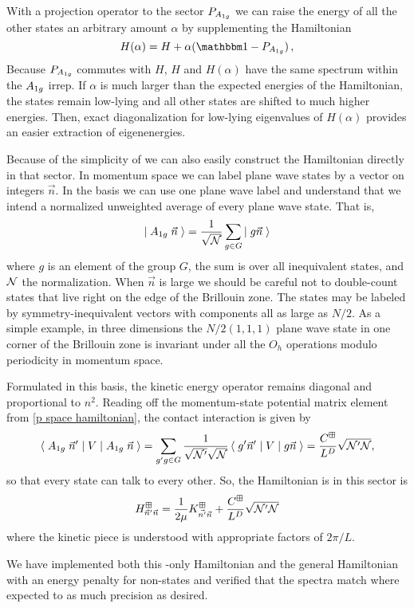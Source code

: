 With a projection operator to the \Aoneg sector $P_{A_{1g}}$ we can raise the energy of all the other states an arbitrary amount $\alpha$ by supplementing the Hamiltonian
\begin{equation}
    H(\alpha) = H + \alpha (\one - P_{\Aoneg}) \, ,
\end{equation}
Because $P_{A_{1g}}$ commutes with $H$, $H$ and $H(\alpha)$ have the same spectrum within the $A_{1g}$ irrep.
If $\alpha$ is much larger than the expected energies of the Hamiltonian, the \Aoneg states remain low-lying and all other states are shifted to much higher energies.
Then, exact diagonalization for low-lying eigenvalues of $H(\alpha)$ provides an easier extraction of \Aoneg eigenenergies.

Because of the simplicity of \Aoneg we can also easily construct the Hamiltonian directly in that sector.
In momentum space we can label plane wave states by a vector on integers $\vec{n}$.
In the \Aoneg basis we can use one plane wave label and understand that we intend a normalized unweighted average of every plane wave state.
That is,
\begin{equation}
    \left|\;A_{1g}\; \vec{n}\;\right\rangle = \frac{1}{\sqrt{\mathcal{N}}} \sum_{g \in G} \left|\; g\vec{n}\;\right\rangle
\end{equation}
where $g$ is an element of the group $G$, the sum is over all inequivalent states, and $\mathcal{N}$ the normalization.
When $\vec{n}$ is large we should be careful not to double-count states that live right on the edge of the Brillouin zone.
The states may be labeled by symmetry-inequivalent vectors with components all as large as $N/2$.
As a simple example, in three dimensions the $N/2(1,1,1)$ plane wave state in one corner of the Brillouin zone is invariant under all the $O_h$ operations modulo periodicity in momentum space.

Formulated in this basis, the kinetic energy operator remains diagonal and proportional to $n^2$.
Reading off the momentum-state potential matrix element from \eqref{p space hamiltonian}, the contact interaction is given by
\begin{equation}
    \left\langle\;A_{1g}\; \vec{n}'\;\middle|\;V\;\middle|\;A_{1g}\; \vec{n}\;\right\rangle
    =
    \sum_{g'g \in G}
        \frac{1}{\sqrt{\mathcal{N}'}\sqrt{\mathcal{N}}} \left\langle\;g'\vec{n}'\;\middle|\;V\;\middle|\;g\vec{n}\;\right\rangle
    =
    \frac{C^\boxplus}{L^D} \sqrt{\mathcal{N}'\mathcal{N}},
\end{equation}
so that every \Aoneg state can talk to every other.
So, the Hamiltonian is in this sector is
\begin{equation}
    H_{\vec{n}'\vec{n}}^\boxplus = \frac{1}{2\mu} K_{\vec{n'}\vec{n}}^\boxplus + \frac{C^\boxplus}{L^D} \sqrt{\mathcal{N}'\mathcal{N}}
\end{equation}
where the kinetic piece is understood with appropriate factors of $2\pi/L$.

We have implemented both this \Aoneg-only Hamiltonian and the general Hamiltonian with an energy penalty for non-\Aoneg states and verified that the spectra match where expected to as much precision as desired.
